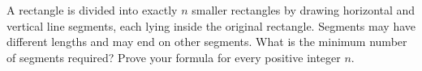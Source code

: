 A rectangle is divided into exactly $n$ smaller rectangles by drawing horizontal and vertical line segments, each lying inside the original rectangle. Segments may have different lengths and may end on other segments. What is the minimum number of segments required? Prove your formula for every positive integer $n$.
